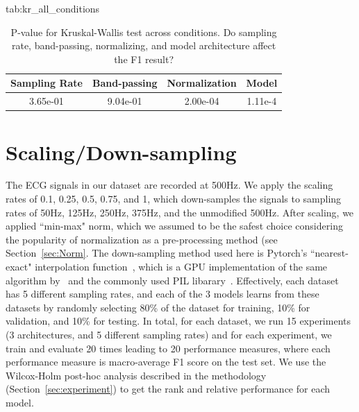 \documentclass[pmlr,twocolumn]{jmlr}%
\begin{document}
\begin{table}[!h]
\floatconts
  {tab:kr_all_conditions}
  {\caption{P-value for Kruskal-Wallis test across conditions. Do sampling rate, band-passing, normalizing, and model architecture affect the F1 result?}}
  {\vspace{-6mm}\begin{tabular}{|c|c|c|c|}
  \hline
    \bfseries Sampling Rate & \bfseries Band-passing & \bfseries Normalization & \bfseries Model \\
  \hline
  3.65e-01 & 9.04e-01 & 2.00e-04 & 1.11e-4  \\
  \hline
  \end{tabular}}
\end{table}



\section{Scaling/Down-sampling}
\label{sec:scaling}
The ECG signals in our dataset are recorded at 500Hz. We apply the  scaling rates of 0.1, 0.25, 0.5, 0.75, and 1, which down-samples the signals to sampling rates of 50Hz, 125Hz, 250Hz, 375Hz, and the unmodified 500Hz. After scaling, we applied ``min-max" norm, which we assumed to be the safest choice considering the popularity of normalization as a pre-processing method (see Section~\ref{sec:Norm}. The down-sampling method used here is Pytorch's ``nearest-exact" interpolation function~\citep{NEURIPS2019_9015}, which is a GPU implementation of the same algorithm by~\citet{van2014scikit} and the commonly used PIL libarary~\citep{clark2015pillow}. Effectively, each dataset has 5 different sampling rates, and each of the 3 models learns from these datasets by randomly selecting 80\% of the dataset for training, 10\% for validation, and 10\% for testing. In total, for each dataset, we run 15 experiments (3 architectures, and 5 different sampling rates) and for each experiment, we train and evaluate 20 times leading to 20 performance measures, where each performance measure is macro-average F1 score on the test set. We use the Wilcox-Holm post-hoc analysis described in the methodology (Section~\ref{sec:experiment}) to get the rank and relative performance for each model. 
\end{document}
